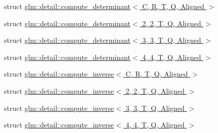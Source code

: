\begin{DoxyCompactItemize}
\item 
struct \hyperlink{structglm_1_1detail_1_1compute__determinant}{glm\+::detail\+::compute\+\_\+determinant$<$ C, R, T, Q, Aligned $>$}
\item 
struct \hyperlink{structglm_1_1detail_1_1compute__determinant_3_012_00_012_00_01T_00_01Q_00_01Aligned_01_4}{glm\+::detail\+::compute\+\_\+determinant$<$ 2, 2, T, Q, Aligned $>$}
\item 
struct \hyperlink{structglm_1_1detail_1_1compute__determinant_3_013_00_013_00_01T_00_01Q_00_01Aligned_01_4}{glm\+::detail\+::compute\+\_\+determinant$<$ 3, 3, T, Q, Aligned $>$}
\item 
struct \hyperlink{structglm_1_1detail_1_1compute__determinant_3_014_00_014_00_01T_00_01Q_00_01Aligned_01_4}{glm\+::detail\+::compute\+\_\+determinant$<$ 4, 4, T, Q, Aligned $>$}
\item 
struct \hyperlink{structglm_1_1detail_1_1compute__inverse}{glm\+::detail\+::compute\+\_\+inverse$<$ C, R, T, Q, Aligned $>$}
\item 
struct \hyperlink{structglm_1_1detail_1_1compute__inverse_3_012_00_012_00_01T_00_01Q_00_01Aligned_01_4}{glm\+::detail\+::compute\+\_\+inverse$<$ 2, 2, T, Q, Aligned $>$}
\item 
struct \hyperlink{structglm_1_1detail_1_1compute__inverse_3_013_00_013_00_01T_00_01Q_00_01Aligned_01_4}{glm\+::detail\+::compute\+\_\+inverse$<$ 3, 3, T, Q, Aligned $>$}
\item 
struct \hyperlink{structglm_1_1detail_1_1compute__inverse_3_014_00_014_00_01T_00_01Q_00_01Aligned_01_4}{glm\+::detail\+::compute\+\_\+inverse$<$ 4, 4, T, Q, Aligned $>$}
\end{DoxyCompactItemize}
